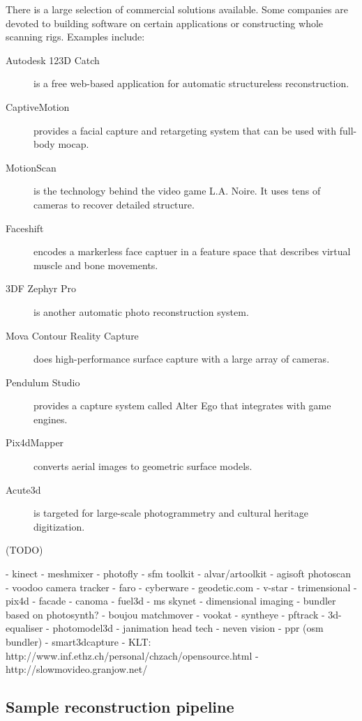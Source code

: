 There is a large selection of commercial solutions available. Some companies are devoted to building software on certain applications or constructing whole scanning rigs. Examples include:
\begin{description}
\item[Autodesk 123D Catch] is a free web-based application for automatic structureless reconstruction.
\item[CaptiveMotion] provides a facial capture and retargeting system that can be used with full-body mocap.
\item[MotionScan] is the technology behind the video game L.A. Noire. \cite{rockstar2011noire} It uses tens of cameras to recover detailed structure.
\item[Faceshift] encodes a markerless face captuer in a feature space that describes virtual muscle and bone movements.
\item[3DF Zephyr Pro] is another automatic photo reconstruction system.
\item[Mova Contour Reality Capture] does high-performance surface capture with a large array of cameras.
\item[Pendulum Studio] provides a capture system called Alter Ego that integrates with game engines.
\item[Pix4dMapper] converts aerial images to geometric surface models.
\item[Acute3d] is targeted for large-scale photogrammetry and cultural heritage digitization.
\end{description}


(TODO)

- kinect
- meshmixer
- photofly
- sfm toolkit
- alvar/artoolkit
- agisoft photoscan
- voodoo camera tracker
- faro
- cyberware
- geodetic.com
- v-star
- trimensional
- pix4d
- facade
- canoma
- fuel3d
- ms skynet
- dimensional imaging
- bundler based on photosynth?
- boujou matchmover
- vookat
- syntheye
- pftrack
- 3d-equaliser
- photomodel3d
- janimation head tech
- neven vision
- ppr (osm bundler)
- smart3dcapture
- KLT: http://www.inf.ethz.ch/personal/chzach/opensource.html
- http://slowmovideo.granjow.net/


\subsection{Sample reconstruction pipeline} %

